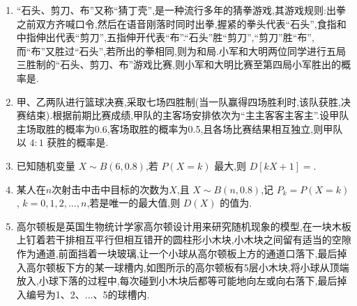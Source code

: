 \begin{enumerate}
\begin{jieda}
\begin{enumerate}
            \item 由题意,需求量的最小值为 200,最大值为 500,所以只需考虑 ${200} \leq  n \leq  {500}$ 的情形,当 ${300} \leq  n \leq  {500}$ 时,若最高气温不低于 25,则 $Y =$${6n} - {4n} = {2n}$ ;若最高气温位于 $\lbrack {20},{25})$ ,则 $Y = 2 \times  {300} - 2 \times  (n -$${300}) = {1200} - {2n}$ ;若最高气温低于 20,则 $Y = 2 \times  {200} - 2 \times  \left( {n - {200}}\right)  =$${800} - {2n}$ .故 $E\left( Y\right)  = \dfrac{2}{5} \times  {2n} + \dfrac{2}{5}\left( {{1200} - {2n}}\right)  + \dfrac{1}{5}\left( {{800} - {2n}}\right)$$= {640} - \dfrac{2}{5}n$ ,所以当 $n = {300}$ 时, $E\left( Y\right)$ 最大,为 520.当 ${200} \leq  n < {300}$ 时,若最高气温不低于 20,则 $Y =$${6n} - {4n} = {2n}$ ;若最高气温低于 20,则 $Y = 2 \times  {200} - 2\left( {n - {200}}\right)  =$${800} - {2n}$ .故 $E\left( Y\right)  = \dfrac{4}{5} \times  {2n} + \dfrac{1}{5}\left( {{800} - {2n}}\right)  = {160} + \dfrac{6}{5}n <$${160} + \dfrac{6}{5} \times  {300} = {520}.$综上所述,当 $n = {300}$ 时, $Y$ 的数学期望达到最大值 520.
        \end{enumerate}
    \end{jieda}
        
    \item “石头、剪刀、布”又称“猜丁壳”,是一种流行多年的猜拳游戏,其游戏规则:出拳之前双方齐喊口令,然后在语音刚落时同时出拳,握紧的拳头代表“石头”,食指和中指伸出代表“剪刀”,五指伸开代表“布”.“石头”胜“剪刀”,“剪刀”胜“布”,而“布”又胜过“石头”,若所出的拳相同,则为和局.小军和大明两位同学进行五局三胜制的“石头、剪刀、布”游戏比赛,则小军和大明比赛至第四局小军胜出的概率是.

    \item 甲、乙两队进行篮球决赛,采取七场四胜制(当一队赢得四场胜利时,该队获胜,决赛结束).根据前期比赛成绩,甲队的主客场安排依次为“主主客客主客主”.设甲队主场取胜的概率为0.6,客场取胜的概率为0.5,且各场比赛结果相互独立,则甲队以 $4:1$ 获胜的概率是.
    
    \item 已知随机变量 $X\sim B(6,0.8)$,若 $P(X=k)$ 最大,则 $D[kX+1]=$.
    
    \item 某人在$n$次射击中击中目标的次数为$X$,且 $X\sim B(n,0.8)$,记 $P_{k}=P(X=k)$, $k=0,1,2,\dots,n$,若是唯一的最大值,则 $D(X)$ 的值为.

    \item 高尔顿板是英国生物统计学家高尔顿设计用来研究随机现象的模型,在一块木板上钉着若干排相互平行但相互错开的圆柱形小木块,小木块之间留有适当的空隙作为通道,前面挡着一块玻璃,让一个小球从高尔顿板上方的通道口落下,最后掉入高尔顿板下方的某一球槽内,如图所示的高尔顿板有5层小木块,将小球从顶端放入,小球下落的过程中,每次碰到小木块后都等可能地向左或向右落下,最后掉入编号为1、2、$\dots$、5的球槽内.
    

\end{enumerate}
